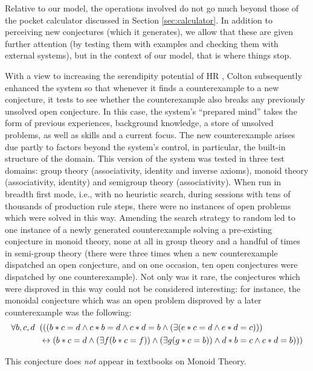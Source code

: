 Relative to our model, the operations involved do not go much beyond
those of the pocket calculator discussed in Section
\ref{sec:calculator}.  In addition to perceiving new conjectures
(which it generates), we allow that these are given further attention
(by testing them with examples and checking them with external systems),
but in the context of our model, that is where things stop.

\begin{ex}\label{ex:monoid}
With a view to increasing the serendipity potential of {\sf HR} , Colton 
subsequently enhanced the system so that whenever it finds a
counterexample to a new conjecture, it tests to see whether the
counterexample also breaks any previously unsolved open conjecture.
In this case, the system's ``prepared mind'' takes the form of previous
experiences, background knowledge, a store of unsolved problems, as
well as skills and a current focus.  The new counterexample arises
due partly to factors beyond the system's control, in particular, the
built-in structure of the
domain.
This version of the system was tested in three test domains:  group theory (associativity, identity and inverse axioms), monoid theory (associativity, identity) and semigroup theory (associativity). When run in breadth first mode, i.e., with no heuristic search, during sessions with tens of thousands of production rule steps, there were no instances of open problems which were solved in this way. Amending the search strategy to random led to one instance of a newly generated counterexample solving a pre-existing conjecture in monoid theory, none at all in group theory and a handful of times in semi-group theory (there were three times when a new counterexample dispatched an open conjecture, and on one occasion, ten open conjectures were dispatched by one counterexample).  Not only was it rare, the conjectures which were disproved in this way could not be considered interesting: for instance, the monoidal conjecture which was an open problem disproved by a later counterexample was the following:
\begin{align*}
\forall b, c, d &\hspace{.2cm}(((b * c = d \wedge c * b = d \wedge c * d = b \wedge (\exists(e * c = d \wedge e * d = c)))\\
&\hspace{.2cm}\leftrightarrow(b * c = d \wedge (\exists f(b * c = f)) \wedge (\exists g(g * c = b)) \wedge d * b = c \wedge c * d = b)))
\end{align*}

\noindent This conjecture does {\em not} appear in textbooks on Monoid Theory.
\end{ex}

